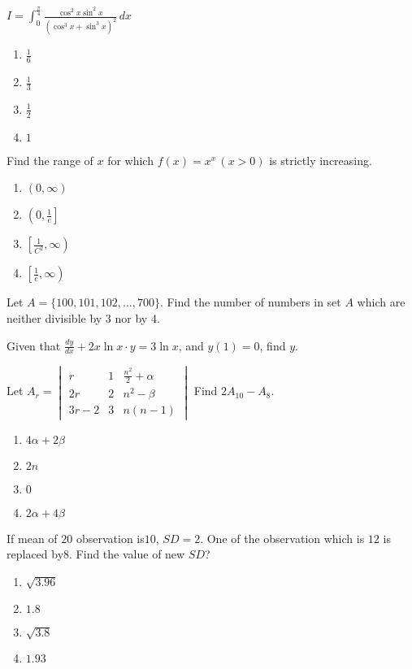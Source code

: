 \iffalse
\title{06-04-2024}
\author{EE24BTECH11004}
\section{mcq-single}
\fi
\item $I = \int_{0}^{\frac{\pi}{4}} \frac{\cos^2 x \sin^2 x}{\left( \cos^3 x + \sin^3 x \right)^2} \, dx$
\begin{enumerate}
    \item $\frac{1}{6}$
    \item $\frac{1}{3}$
    \item $\frac{1}{2}$
    \item $1$
\end{enumerate}
\item Find the range of $x$ for which $f(x) = x^x \, (x > 0)$ is strictly increasing.
\begin{enumerate}
    \item $ (0, \infty) $
    \item $ \left( 0, \frac{1}{e} \right] $
    \item $ \left[ \frac{1}{C^2}, \infty \right) $
    \item $ \left[ \frac{1}{e}, \infty \right) $
\end{enumerate}
\item Let $A = \{100, 101, 102, \dots, 700\}$. Find the number of numbers in set $A$ which are neither divisible by 3 nor by 4.
\item Given that $\frac{dy}{dx} + 2x \ln{x} \cdot y = 3 \ln{x}$, and $y(1) = 0$, find $y$.
\item Let 
$A_r = \begin{vmatrix}
r & 1 & \frac{n^2}{2} + \alpha \\
2r & 2 & n^2 - \beta \\
3r - 2 & 3 & n(n-1)
\end{vmatrix}$
Find $2A_{10} - A_8$.
\begin{enumerate}
    \item $ 4\alpha + 2\beta $
    \item $ 2n $
    \item $ 0 $
    \item $ 2\alpha + 4\beta $
\end{enumerate}
\item If mean of $20$ observation is$ 10$, $SD = 2$. One of the observation which is $12$ is replaced by$ 8$.
Find the value of new $SD$?
\begin{enumerate}
    \item $ \sqrt{3.96} $
\item $1.8$
\item $ \sqrt{3.8} $
\item $1.93$
\end{enumerate}
